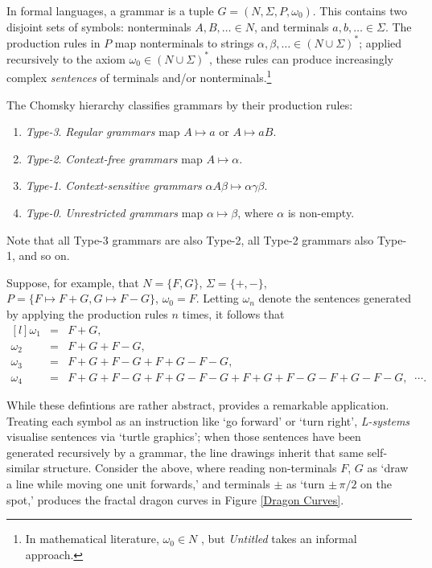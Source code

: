 \documentclass[a4paper, 11pt]{article}
\begin{document}
\begin{flushleft}
\vspace{5pt}\noindent
In formal languages, a grammar is a tuple $G = (N,\Sigma,P,\omega_0)$. This contains two disjoint sets of symbols: nonterminals $A, B, \dots \in N$, and terminals $a, b, \dots \in \Sigma$. The production rules in $P$ map nonterminals to strings $\alpha, \beta, \dots \in (N\cup\Sigma)^*$; applied recursively to the axiom $\omega_0 \in (N\cup\Sigma)^*$, these rules can produce increasingly complex \textit{sentences} of terminals and/or nonterminals.\footnote{In mathematical literature, $
\omega_0 \in N$ \citep*{hopcroftFormalLanguages}, but \textit{Untitled} takes an informal approach.}

\vspace{5pt}\noindent
The Chomsky hierarchy \citep{chomskyHierarchy} %
classifies grammars by their production rules:
\begin{enumerate}[label=,itemsep=0em]
\item \textit{Type-3}. \textit{Regular grammars} map $A \mapsto a$ or $A \mapsto aB$.
\item \textit{Type-2}. \textit{Context-free grammars} map $A \mapsto \alpha$.
\item \textit{Type-1}. \textit{Context-sensitive grammars} $\alpha A\beta \mapsto \alpha\gamma\beta$.
\item \textit{Type-0}. \textit{Unrestricted grammars} map $\alpha \mapsto \beta$, where $\alpha$ is non-empty.
\end{enumerate}
Note that all Type-3 grammars are also Type-2, all Type-2 grammars also Type-1, and so on.

\vspace{5pt}\noindent
Suppose, for example, that $N = \{F, G\}$, $\Sigma = \{+, -\}$, $P = \{F \mapsto F+G, G \mapsto F-G\}$, $\omega_0 = F$.
Letting $\omega_n$ denote the sentences generated by applying the production rules $n$ times, it follows that
$$\begin{matrix*}[l]
\omega_1 &= &F+G, \\
\omega_2 &= &F+G+F-G, \\
\omega_3 &= &F+G+F-G+F+G-F-G, \\
\omega_4 &= &F+G+F-G+F+G-F-G+F+G+F-G-F+G-F-G, \;\; \cdots.
\end{matrix*}$$

\vspace{5pt}\noindent
While these defintions are rather abstract, \citet{lindenmayerLSystems} provides a remarkable application. Treating each symbol as an instruction like `go forward' or `turn right', \textit{L-systems} visualise sentences via `turtle graphics'; when those sentences have been generated recursively by a grammar, the line drawings inherit that same self-similar structure. Consider the above, where reading non-terminals $F$, $G$ as `draw a line while moving one unit forwards,' and terminals $\pm$ as `turn $\pm\, \pi/2$ on the spot,' produces the fractal dragon curves in Figure \ref{Dragon Curves}.


\end{flushleft}
\end{document}
